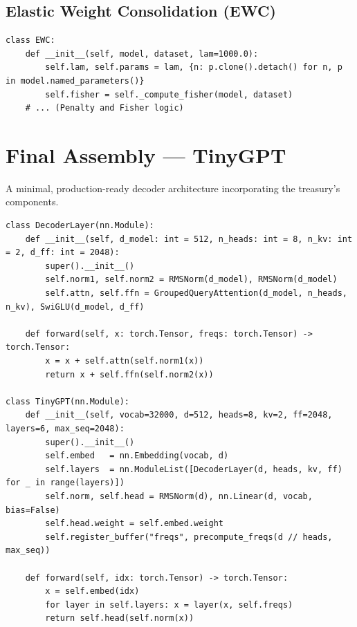 \subsection{Elastic Weight Consolidation (EWC)}
\label{form:ewc}

\begin{lstlisting}[style=pythonstyle, caption={Elastic Weight Consolidation}, label=lst:ewc]
class EWC:
    def __init__(self, model, dataset, lam=1000.0):
        self.lam, self.params = lam, {n: p.clone().detach() for n, p in model.named_parameters()}
        self.fisher = self._compute_fisher(model, dataset)
    # ... (Penalty and Fisher logic)
\end{lstlisting}

\section{Final Assembly --- TinyGPT}
\label{app:tinygpt}

A minimal, production-ready decoder architecture incorporating the treasury's components.

\begin{lstlisting}[style=pythonstyle, caption={Complete TinyGPT architecture}, label=lst:tinygpt]
class DecoderLayer(nn.Module):
    def __init__(self, d_model: int = 512, n_heads: int = 8, n_kv: int = 2, d_ff: int = 2048):
        super().__init__()
        self.norm1, self.norm2 = RMSNorm(d_model), RMSNorm(d_model)
        self.attn, self.ffn = GroupedQueryAttention(d_model, n_heads, n_kv), SwiGLU(d_model, d_ff)

    def forward(self, x: torch.Tensor, freqs: torch.Tensor) -> torch.Tensor:
        x = x + self.attn(self.norm1(x))
        return x + self.ffn(self.norm2(x))

class TinyGPT(nn.Module):
    def __init__(self, vocab=32000, d=512, heads=8, kv=2, ff=2048, layers=6, max_seq=2048):
        super().__init__()
        self.embed   = nn.Embedding(vocab, d)
        self.layers  = nn.ModuleList([DecoderLayer(d, heads, kv, ff) for _ in range(layers)])
        self.norm, self.head = RMSNorm(d), nn.Linear(d, vocab, bias=False)
        self.head.weight = self.embed.weight 
        self.register_buffer("freqs", precompute_freqs(d // heads, max_seq))

    def forward(self, idx: torch.Tensor) -> torch.Tensor:
        x = self.embed(idx)
        for layer in self.layers: x = layer(x, self.freqs)
        return self.head(self.norm(x))
\end{lstlisting}
